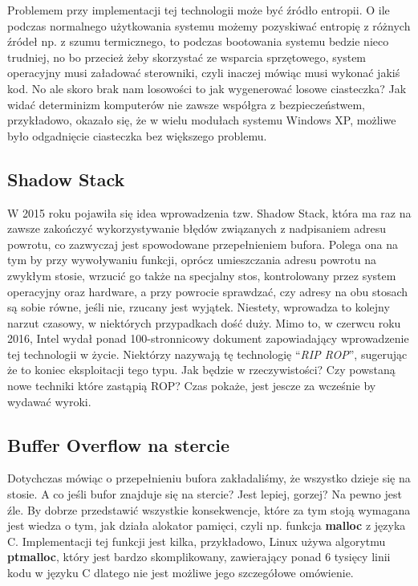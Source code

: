 \documentclass[polish]{kbk}
\begin{document}
Problemem przy implementacji tej technologii może być źródło entropii. O ile podczas normalnego użytkowania systemu możemy pozyskiwać entropię z różnych źródeł np. z szumu termicznego, to podczas bootowania systemu bedzie nieco trudniej, no bo przecież żeby skorzystać ze wsparcia sprzętowego, system operacyjny musi załadować sterowniki, czyli inaczej mówiąc musi wykonać jakiś kod. No ale skoro brak nam losowości to jak wygenerować losowe ciasteczka? Jak widać determinizm komputerów nie zawsze współgra z bezpieczeństwem, przykładowo, okazało się, że w wielu modułach systemu Windows XP, możliwe było odgadnięcie ciasteczka bez większego problemu\cite{cookieentropy}.
\subsection{Shadow Stack}
W 2015 roku pojawiła się idea wprowadzenia tzw. Shadow Stack\cite{shadow}, która ma raz na zawsze zakończyć wykorzystywanie błędów związanych z nadpisaniem adresu powrotu, co zazwyczaj jest spowodowane przepełnieniem bufora. Polega ona na tym by przy wywoływaniu funkcji, oprócz umieszczania adresu powrotu na zwykłym stosie, wrzucić go także na specjalny stos, kontrolowany przez system operacyjny oraz hardware, a przy powrocie sprawdzać, czy adresy na obu stosach są sobie równe, jeśli nie, rzucany jest wyjątek. Niestety, wprowadza to kolejny narzut czasowy, w niektórych przypadkach dość duży. Mimo to, w czerwcu roku 2016, Intel wydał ponad 100-stronnicowy dokument zapowiadający wprowadzenie tej technologii w życie\cite{shadowintel}. Niektórzy\cite{riprop} nazywają tę technologię ``\emph{RIP ROP}'', sugerując że to koniec eksploitacji tego typu. Jak będzie w rzeczywistości? Czy powstaną nowe techniki które zastąpią ROP? Czas pokaże, jest jescze za wcześnie by wydawać wyroki.
\subsection{Buffer Overflow na stercie}
Dotychczas mówiąc o przepełnieniu bufora zakładaliśmy, że wszystko dzieje się na stosie. A co jeśli  bufor znajduje się na stercie? Jest lepiej, gorzej? Na pewno jest źle. By dobrze przedstawić wszystkie konsekwencje, które za tym stoją wymagana jest wiedza o tym, jak działa alokator pamięci, czyli np. funkcja \textbf{malloc} z języka C. Implementacji tej funkcji jest kilka, przykładowo, Linux używa algorytmu \textbf{ptmalloc}, który jest bardzo skomplikowany\cite{malloc}, zawierający ponad 6 tysięcy linii kodu w języku C dlatego nie jest możliwe jego szczegółowe omówienie.
\end{document}
